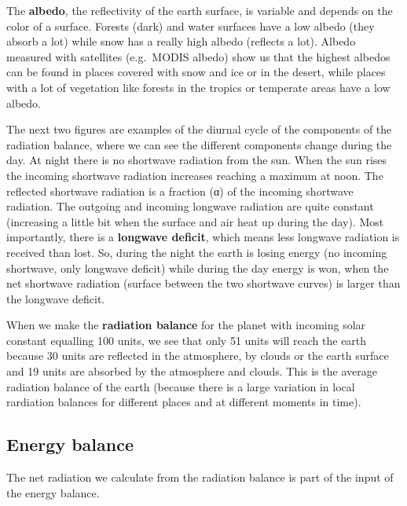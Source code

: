 \documentclass[oneside]{book}
\begin{document}
The \textbf{albedo}, the reflectivity of the earth surface, is variable
and depends on the color of a surface. Forests (dark) and water surfaces
have a low albedo (they absorb a lot) while snow has a really high
albedo (reflects a lot). Albedo measured with satellites (e.g.~MODIS
albedo) show us that the highest albedos can be found in places covered
with snow and ice or in the desert, while places with a lot of
vegetation like forests in the tropics or temperate areas have a low
albedo.

The next two figures are examples of the diurnal cycle of the components
of the radiation balance, where we can see the different components
change during the day. At night there is no shortwave radiation from the
sun. When the sun rises the incoming shortwave radiation increases
reaching a maximum at noon. The reflected shortwave radiation is a
fraction (α) of the incoming shortwave radiation. The outgoing and
incoming longwave radiation are quite constant (increasing a little bit
when the surface and air heat up during the day). Most importantly,
there is a \textbf{longwave deficit}, which means less longwave
radiation is received than lost. So, during the night the earth is
losing energy (no incoming shortwave, only longwave deficit) while
during the day energy is won, when the net shortwave radiation (surface
between the two shortwave curves) is larger than the longwave deficit.

When we make the \textbf{radiation balance} for the planet with incoming
solar constant equalling 100 units, we see that only 51 units will reach
the earth because 30 units are reflected in the atmosphere, by clouds or
the earth surface and 19 units are absorbed by the atmosphere and
clouds. This is the average radiation balance of the earth (because
there is a large variation in local rardiation balances for different
places and at different moments in time).

\subsection{Energy balance}\label{energy-balance-1}

The net radiation we calculate from the radiation balance is part of the
input of the energy balance.
\end{document}
